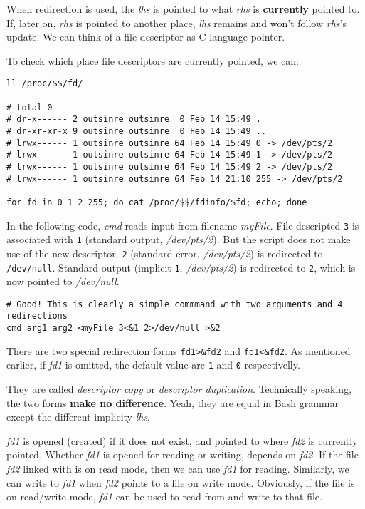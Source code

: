 When redirection is used, the \textit{lhs} is pointed to what
\textit{rhs} is \textbf{currently} pointed to. If, later on,
\textit{rhs} is pointed to another place, \textit{lhs} remains and
won't follow \textit{rhs}'s update. We can think of a file
descriptor as C language pointer.

To check which place file descriptors are currently pointed, we
can:

\begin{lstlisting}
ll /proc/$$/fd/

# total 0
# dr-x------ 2 outsinre outsinre  0 Feb 14 15:49 .
# dr-xr-xr-x 9 outsinre outsinre  0 Feb 14 15:49 ..
# lrwx------ 1 outsinre outsinre 64 Feb 14 15:49 0 -> /dev/pts/2
# lrwx------ 1 outsinre outsinre 64 Feb 14 15:49 1 -> /dev/pts/2
# lrwx------ 1 outsinre outsinre 64 Feb 14 15:49 2 -> /dev/pts/2
# lrwx------ 1 outsinre outsinre 64 Feb 14 21:10 255 -> /dev/pts/2

for fd in 0 1 2 255; do cat /proc/$$/fdinfo/$fd; echo; done
\end{lstlisting}

In the following code, \textit{cmd} reads input from filename
\textit{myFile}. File descripted \verb|3| is associated with
\verb|1| (standard output, \textit{/dev/pts/2}). But the script
does not make use of the new descriptor. \verb|2| (standard error,
\textit{/dev/pts/2}) is redirected to
\lstinline|/dev/null|. Standard output (implicit \verb|1|,
\textit{/dev/pts/2}) is redirected to \verb|2|, which is now
pointed to \textit{/dev/null}.

\begin{lstlisting}
# Good! This is clearly a simple commmand with two arguments and 4 redirections
cmd arg1 arg2 <myFile 3<&1 2>/dev/null >&2
\end{lstlisting}

There are two special redirection forms \lstinline|fd1>&fd2| and
\lstinline|fd1<&fd2|. As mentioned earlier, if \textit{fd1} is
omitted, the default value are \verb|1| and \verb|0|
respectivelly.

They are called \textit{descriptor copy} or \textit{descriptor
  duplication}. Technically speaking, the two forms \textbf{make no
  difference}. Yeah, they are equal in Bash grammar except the
different implicity \textit{lhs}.

\textit{fd1} is opened (created) if it does not exist, and pointed
to where \textit{fd2} is currently pointed. Whether \textit{fd1}
is opened for reading or writing, depends on \textit{fd2}. If the
file \textit{fd2} linked with is on read mode, then we can use
\textit{fd1} for reading. Similarly, we can write to \textit{fd1}
when \textit{fd2} points to a file on write mode. Obviously, if
the file is on read/write mode, \textit{fd1} can be used to read
from and write to that file.

